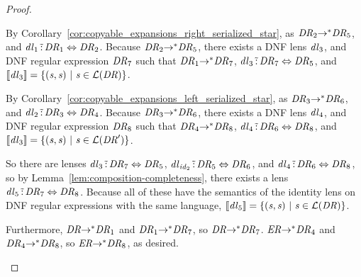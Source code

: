 \documentclass[numbers,10pt,preprint\ifanon ,nocopyrightspace\fi]{sigplanconf}
\begin{document}
\begin{proof}
\begin{case}[\TransitivityRule{}]
    By Corollary~\ref{cor:copyable_expansions_right_serialized_star},
    as $\mathit{DR}_2 {\rightarrow}^* \mathit{DR}_5$, and
    $\mathit{dl}_1 \,\tilde{:}\, \mathit{DR}_1 \Leftrightarrow \mathit{DR}_2$.
    Because $\mathit{DR}_2 {\rightarrow}^* \mathit{DR}_5$, there exists a
    DNF lens $\mathit{dl}_3$, and DNF regular expression $\mathit{DR}_7$ such that
    $\mathit{DR}_1 {\rightarrow}^* \mathit{DR}_7$, $\mathit{dl}_3 \,\tilde{:}\,
    \mathit{DR}_7 \Leftrightarrow \mathit{DR}_5$, and
    $[ \! [\mathit{dl}_3] \! ] =
    \{(\mathit{s},\mathit{s}) ~|~ \mathit{s} \in \mathcal{L}(\mathit{DR})\}$.

    By Corollary~\ref{cor:copyable_expansions_left_serialized_star},
    as $\mathit{DR}_3 {\rightarrow}^* \mathit{DR}_6$, and
    $\mathit{dl}_2 \,\tilde{:}\, \mathit{DR}_3 \Leftrightarrow \mathit{DR}_4$.
    Because $\mathit{DR}_3 {\rightarrow}^* \mathit{DR}_6$, there exists a
    DNF lens $\mathit{dl}_4$, and DNF regular expression $\mathit{DR}_8$ such that
    $\mathit{DR}_4 {\rightarrow}^* \mathit{DR}_8$, $\mathit{dl}_4 \,\tilde{:}\,
    \mathit{DR}_6 \Leftrightarrow \mathit{DR}_8$, and
    $[ \! [\mathit{dl}_3] \! ] =
    \{(\mathit{s},\mathit{s}) ~|~ \mathit{s} \in \mathcal{L}(\mathit{DR}')\}$.

    So there are lenses
    $\mathit{dl}_3 \,\tilde{:}\, \mathit{DR}_7 \Leftrightarrow \mathit{DR}_5$,
    $\mathit{dl}_{\mathit{id}_2} \,\tilde{:}\, \mathit{DR}_5 \Leftrightarrow \mathit{DR}_6$, and
    $\mathit{dl}_4 \,\tilde{:}\, \mathit{DR}_6 \Leftrightarrow \mathit{DR}_8$, so
    by Lemma~\ref{lem:composition-completeness}, there exists a lens
    $\mathit{dl}_5 \,\tilde{:}\, \mathit{DR}_7 \Leftrightarrow \mathit{DR}_8$.
    Because all of these have the semantics of the identity lens on DNF regular
    expressions with the same language,
    $[ \! [\mathit{dl}_5] \! ] =
    \{(\mathit{s},\mathit{s}) ~|~ \mathit{s} \in \mathcal{L}(\mathit{DR})\}$.

    Furthermore, $\mathit{DR} {\rightarrow}^* \mathit{DR}_1$ and
    $\mathit{DR}_1 {\rightarrow}^* \mathit{DR}_7$, so
    $\mathit{DR} {\rightarrow}^* \mathit{DR}_7$.
    $\mathit{ER} {\rightarrow}^* \mathit{DR}_4$ and
    $\mathit{DR}_4 {\rightarrow}^* \mathit{DR}_8$, so
    $\mathit{ER} {\rightarrow}^* \mathit{DR}_8$, as desired.
  \end{case}
\end{proof}
\end{document}
